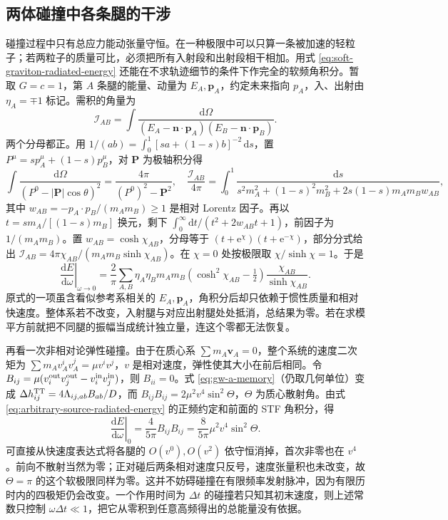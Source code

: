 \subsection{两体碰撞中各条腿的干涉}

碰撞过程中只有总应力能动张量守恒。在一种极限中可以只算一条被加速的轻粒子；若两粒子的质量可比，必须把所有入射段和出射段相干相加。用式 \eqref{eq:soft-graviton-radiated-energy} 还能在不求轨迹细节的条件下作完全的软频角积分。暂取 $G=c=1$，第 $A$ 条腿的能量、动量为 $E_A,\bm p_A$，约定未来指向 $p_A$，入、出射由 $\eta_A=\mp1$ 标记。需积的角量为
\[
 \mathcal I_{AB}=\int\!\frac{\mathrm d\Omega}
 {(E_A-\bm n\cdot\bm p_A)(E_B-\bm n\cdot\bm p_B)} .
\]
两个分母都正。用 $1/(ab)=\int_0^1 [sa+(1-s)b]^{-2}\,\mathrm ds$，置 $P^\mu=sp_A^\mu+(1-s)p_B^\mu$，对 $\bm P$ 为极轴积分得
\[
 \int\!\frac{\mathrm d\Omega}{(P^0-|\bm P|\cos\theta)^2}
   =\frac{4\pi}{(P^0)^2-\bm P^2},\quad
 \frac{\mathcal I_{AB}}{4\pi}
 =\int_0^1\!\frac{\mathrm ds}
 {s^2m_A^2+(1-s)^2m_B^2+2s(1-s)m_Am_Bw_{AB}} ,
\]
其中 $w_{AB}=-p_A\cdot p_B/(m_Am_B)\ge1$ 是相对 Lorentz 因子。再以 $t=sm_A/[(1-s)m_B]$ 换元，剩下 $\int_0^\infty\mathrm dt/(t^2+2w_{AB}t+1)$，前因子为 $1/(m_Am_B)$。置 $w_{AB}=\cosh\chi_{AB}$，分母等于 $(t+\mathrm e^\chi)(t+\mathrm e^{-\chi})$，部分分式给出 $\mathcal I_{AB}=4\pi\chi_{AB}/(m_Am_B\sinh\chi_{AB})$。在 $\chi=0$ 处按极限取 $\chi/\sinh\chi=1$。于是
\[
 \left.\frac{\mathrm dE}{\mathrm d\omega}\right|_{\omega\to0}
 =\frac{2}{\pi}\sum_{A,B}\eta_A\eta_Bm_A m_B
 \left(\cosh^2\chi_{AB}-\tfrac12\right)
 \frac{\chi_{AB}}{\sinh\chi_{AB}} .
\]
原式的一项虽含看似参考系相关的 $E_A,\bm p_A$，角积分后却只依赖于惯性质量和相对快速度。整体系若不改变，入射腿与对应出射腿处处抵消，总结果为零。若在求模平方前就把不同腿的振幅当成统计独立量，连这个零都无法恢复。

再看一次非相对论弹性碰撞。由于在质心系 $\sum m_A\bm v_A=0$，整个系统的速度二次矩为 $\sum m_A v_A^i v_A^j=\mu v^iv^j$，$v$ 是相对速度，弹性使其大小在前后相同。令 $B_{ij}=\mu(v_i^{\rm out}v_j^{\rm out}-v_i^{\rm in}v_j^{\rm in})$，则 $B_{ii}=0$。式 \eqref{eq:gw-a-memory}（仍取几何单位）变成 $\Delta h^{\rm TT}_{ij}=4\Lambda_{ij,ab} B_{ab}/D$，而 $B_{ij} B_{ij}=2\mu^2v^4\sin^2\Theta$，$\Theta$ 为质心散射角。由式 \eqref{eq:arbitrary-source-radiated-energy} 的正频约定和前面的 STF 角积分，得
\[
 \left.\frac{\mathrm dE}{\mathrm d\omega}\right|_{0}
 =\frac{4}{5\pi} B_{ij}B_{ij}
 =\frac{8}{5\pi}\mu^2v^4\sin^2\Theta .
\]
可直接从快速度表达式将各腿的 $O(v^0),O(v^2)$ 依守恒消掉，首次非零也在 $v^4$。前向不散射当然为零；正对碰后两条相对速度只反号，速度张量积也未改变，故 $\Theta=\pi$ 的这个软极限同样为零。这并不妨碍碰撞在有限频率发射脉冲，因为有限历时内的四极矩仍会改变。一个作用时间为 $\Delta t$ 的碰撞若只知其初末速度，则上述常数只控制 $\omega\Delta t\ll1$，把它从零积到任意高频得出的总能量没有依据。

